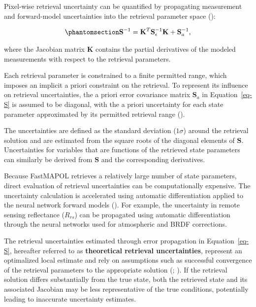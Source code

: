 \documentclass[
  11pt,
  letterpaper,
]{scrreprt}
\begin{document}
Pixel-wise retrieval uncertainty can be quantified by propagating
measurement and forward-model uncertainties into the retrieval parameter
space ():

\begin{equation}\phantomsection\label{eq-S}{
\mathbf{S}^{-1}
=
\mathbf{K}^{T}
\mathbf{S}_{\epsilon}^{-1}
\mathbf{K}
+
\mathbf{S}_{a}^{-1},
}\end{equation}

where the Jacobian matrix \(\mathbf{K}\) contains the partial
derivatives of the modeled measurements with respect to the retrieval
parameters.

Each retrieval parameter is constrained to a finite permitted range,
which imposes an implicit a priori constraint on the retrieval. To
represent its influence on retrieval uncertainties, the a priori error
covariance matrix \(\mathbf{S}_a\) in Equation~\ref{eq-S} is assumed to
be diagonal, with the a priori uncertainty for each state parameter
approximated by its permitted retrieval range
().

The uncertainties are defined as the standard deviation (\(1\sigma\))
around the retrieval solution and are estimated from the square roots of
the diagonal elements of \(\mathbf{S}\). Uncertainties for variables
that are functions of the retrieved state parameters can similarly be
derived from \(\mathbf{S}\) and the corresponding derivatives.

Because FastMAPOL retrieves a relatively large number of state
parameters, direct evaluation of retrieval uncertainties can be
computationally expensive. The uncertainty calculation is accelerated
using automatic differentiation applied to the neural network forward
models (). For example, the
uncertainty in remote sensing reflectance (\(R_{rs}\)) can be propagated
using automatic differentiation through the neural networks used for
atmospheric and BRDF corrections.

The retrieval uncertainties estimated through error propagation in
Equation~\ref{eq-S}, hereafter referred to as \textbf{theoretical
retrieval uncertainties}, represent an optimalized local estimate and
rely on assumptions such as successful convergence of the retrieval
parameters to the appropriate solution (; ). If the
retrieval solution differs substantially from the true state, both the
retrieved state and its associated Jacobian may be less representative
of the true conditions, potentially leading to inaccurate uncertainty
estimates.
\end{document}
